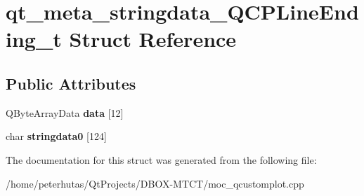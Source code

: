 \hypertarget{structqt__meta__stringdata___q_c_p_line_ending__t}{}\section{qt\+\_\+meta\+\_\+stringdata\+\_\+\+Q\+C\+P\+Line\+Ending\+\_\+t Struct Reference}
\label{structqt__meta__stringdata___q_c_p_line_ending__t}
\subsection*{Public Attributes}
\begin{DoxyCompactItemize}
\item 
\mbox{\label{structqt__meta__stringdata___q_c_p_line_ending__t_afd1b8860d3c0d66e6e4abf54197c47e6}} 
Q\+Byte\+Array\+Data {\bfseries data} \mbox{[}12\mbox{]}
\item 
\mbox{\label{structqt__meta__stringdata___q_c_p_line_ending__t_a20c616613071fe30d8f5bcf67c6851b2}} 
char {\bfseries stringdata0} \mbox{[}124\mbox{]}
\end{DoxyCompactItemize}


The documentation for this struct was generated from the following file\+:\begin{DoxyCompactItemize}
\item 
/home/peterhutas/\+Qt\+Projects/\+D\+B\+O\+X-\/\+M\+T\+C\+T/moc\+\_\+qcustomplot.\+cpp\end{DoxyCompactItemize}
